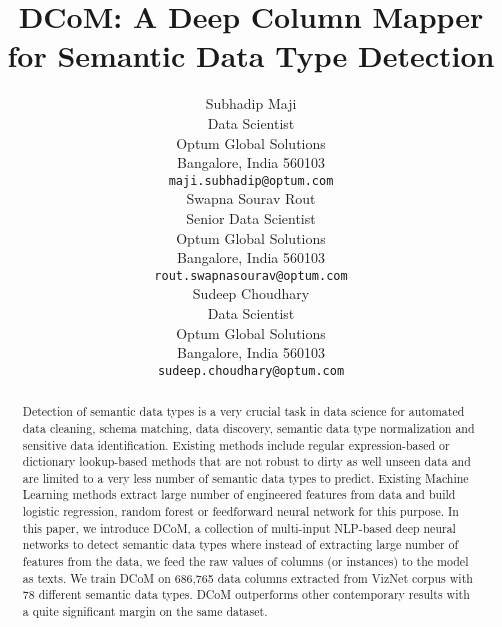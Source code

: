 \documentclass{article}
\title{DCoM: A Deep Column Mapper for Semantic Data Type Detection}
\author{
  Subhadip Maji \\
  Data Scientist\\
  Optum Global Solutions\\
  Bangalore, India 560103 \\
  \texttt{maji.subhadip@optum.com} \\
\And
  Swapna Sourav Rout\\
  Senior Data Scientist\\
  Optum Global Solutions\\
  Bangalore, India 560103 \\
  \texttt{rout.swapnasourav@optum.com} \\
  \And
  Sudeep Choudhary\\
  Data Scientist\\
  Optum Global Solutions\\
  Bangalore, India 560103 \\
  \texttt{sudeep.choudhary@optum.com} \\
}
\begin{document}
\maketitle

\begin{abstract}
	Detection of semantic data types is a very crucial task in data science for automated data cleaning, schema matching, data discovery, semantic data type normalization and sensitive data identification. Existing methods include regular expression-based or dictionary lookup-based methods that are not robust to dirty as well unseen data and are limited to a very less number of semantic data types to predict. Existing Machine Learning methods extract large number of engineered features from data and build logistic regression, random forest or feedforward neural network for this purpose. In this paper, we introduce DCoM, a collection of multi-input NLP-based deep neural networks to detect semantic data types where instead of extracting large number of features from the data, we feed the raw values of columns (or instances) to the model as texts. We train DCoM on 686,765 data columns extracted from VizNet corpus with 78 different semantic data types. DCoM outperforms other contemporary results with a quite significant margin on the same dataset.
\end{abstract}


\end{document}
